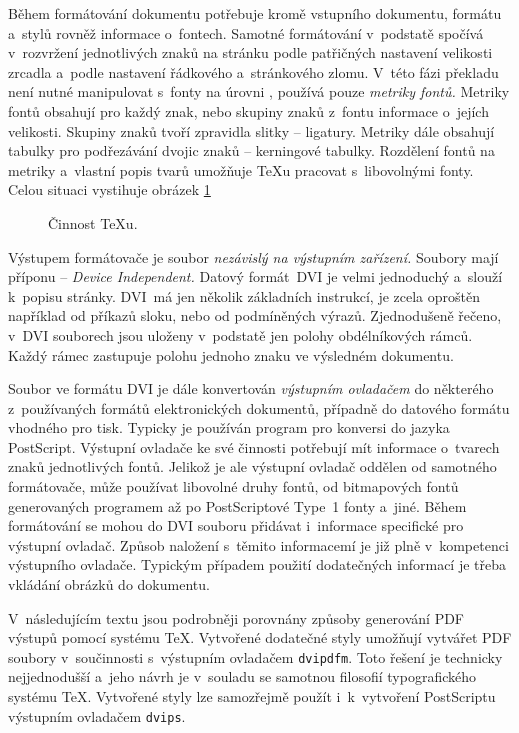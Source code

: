 \documentclass[12pt]{article}
\begin{document}
\medskip
Během formátování dokumentu potřebuje  kromě vstupního dokumentu,
formátu a~stylů rovněž informace o~fontech. Samotné formátování v~podstatě
spočívá v~rozvržení jednotlivých znaků na stránku podle patřičných nastavení
velikosti zrcadla a~podle nastavení řádkového a~stránkového zlomu. V~této
fázi překladu není nutné manipulovat s~fonty 
na úrovni , 
 používá pouze \emph{metriky fontů.}
Metriky fontů obsahují pro každý znak, nebo skupiny znaků z~fontu informace
o~jejích velikosti. Skupiny znaků tvoří zpravidla slitky -- ligatury.
Metriky dále obsahují tabulky pro podřezávání dvojic znaků -- kerningové 
tabulky. Rozdělení fontů na metriky a~vlastní popis tvarů umožňuje 
\TeX u pracovat s~libovolnými fonty. 
Celou situaci vystihuje obrázek \ref{tex_fig}

\begin{figure}
  \centerline{}
  \caption{Činnost \TeX u.}
  \label{tex_fig}
\end{figure}

\medskip
Výstupem formátovače je soubor \emph{nezávislý na výstupním zařízení.} Soubory
mají příponu  -- \emph{Device Independent.} Datový formát~DVI
je velmi jednoduchý a~slouží k~popisu stránky. DVI~má jen několik základních 
instrukcí, je zcela oproštěn například od příkazů sloku, nebo od podmíněných
výrazů. Zjednodušeně řečeno, v~DVI souborech jsou uloženy v~podstatě jen
polohy obdélníkových rámců. 
Každý rámec zastupuje polohu jednoho znaku ve výsledném dokumentu. 

\medskip
Soubor ve formátu DVI je dále konvertován 
\emph{výstupním ovladačem}
do některého z~používaných formátů elektronických dokumentů, 
případně do datového formátu vhodného pro tisk.
Typicky je používán program  pro konversi do jazyka PostScript.
Výstupní ovladače ke své činnosti potřebují mít informace o~tvarech znaků
jednotlivých fontů. Jelikož je ale výstupní ovladač oddělen od samotného 
formátovače, může používat libovolné druhy fontů, od bitmapových fontů
generovaných programem \MF{} až po PostScriptové Type~1 fonty a~jiné.
Během formátování se mohou do DVI souboru přidávat i~informace specifické
pro výstupní ovladač. Způsob naložení s~těmito informacemí je již plně
v~kompetenci výstupního ovladače.
Typickým případem použití dodatečných informací je třeba vkládání obrázků 
do dokumentu.

\medskip
V~následujícím textu jsou podrobněji porovnány způsoby generování PDF výstupů
pomocí systému \TeX. Vytvořené dodatečné styly umožňují vytvářet PDF soubory 
v~součinnosti s~výstupním ovladačem \texttt{dvipdfm}. Toto řešení je
technicky nejjednodušší a~jeho návrh je v~souladu se samotnou
filosofií typografického systému \TeX. Vytvořené styly lze samozřejmě použít
i~k~vytvoření PostScriptu výstupním ovladačem \texttt{dvips}.
\end{document}

